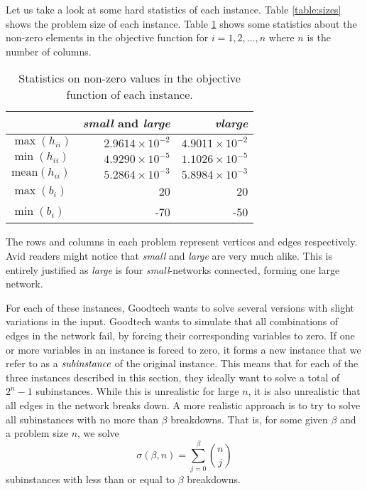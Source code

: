 Let us take a look at some hard statistics of each instance.
Table \ref{table:sizes} shows the problem size of each instance.
Table \ref{table:maxmin} shows some statistics about the non-zero elements in
the objective function for $i = 1,2,\ldots,n$ where $n$ is the number of
columns.
\begin{table}[ht!]
    \centering
    \caption{Statistics on non-zero values in the objective function of
each instance.}

    \begin{tabular}{lrr}
      & \textit{small} and \textit{large}         & \textit{vlarge} \\\hline
    $\max(h_{ii})$      & $2.9614 \times 10^{-2}$ & $4.9011 \times 10^{-2}$ \\
    $\min(h_{ii})$      & $4.9290 \times 10^{-5}$ & $1.1026 \times 10^{-5}$ \\
$\textrm{mean}(h_{ii})$ & $5.2864 \times 10^{-3}$ & $5.8984 \times 10^{-3}$ \\
    $\max(b_{i})$       & 20                      & 20 \\
    $\min(b_{i})$       & -70                     & -50 \\
    \end{tabular}
    \label{table:maxmin}
\end{table}
The rows and columns in each problem represent vertices and edges respectively.
Avid readers might notice that \textit{small} and \textit{large} are very
much alike.
This is entirely justified as \textit{large} is four \textit{small}-networks
connected, forming one large network.

For each of these instances, Goodtech wants to solve several versions
with slight variations in the input.
Goodtech wants to simulate that all combinations of edges in the network
fail, by forcing their corresponding variables to zero.
If one or more variables in an instance is forced to zero, it forms a new
instance that we refer to as a $\emph{subinstance}$ of the original instance.
This means that for each of the three instances described in this section,
they ideally want to solve a total of $2^n - 1$ subinstances. While this is
unrealistic for large $n$, it is also unrealistic that all edges in the
network breaks down.
A more realistic approach is to try to solve all subinstances with no more than
$\beta$ breakdowns.
That is, for some given $\beta$ and a problem size $n$, we solve
\begin{equation}
\sigma(\beta, n) = \sum_{j=0}^\beta {\binom{n}{j}}
\end{equation}
subinstances with less than or equal to $\beta$ breakdowns.
